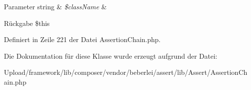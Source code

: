 \begin{DoxyParams}[1]{Parameter}
string & {\em \$class\+Name} & \\
\hline
\end{DoxyParams}
\begin{DoxyReturn}{Rückgabe}
\$this 
\end{DoxyReturn}


Definiert in Zeile 221 der Datei Assertion\+Chain.\+php.



Die Dokumentation für diese Klasse wurde erzeugt aufgrund der Datei\+:\begin{DoxyCompactItemize}
\item 
Upload/framework/lib/composer/vendor/beberlei/assert/lib/\+Assert/Assertion\+Chain.\+php\end{DoxyCompactItemize}
